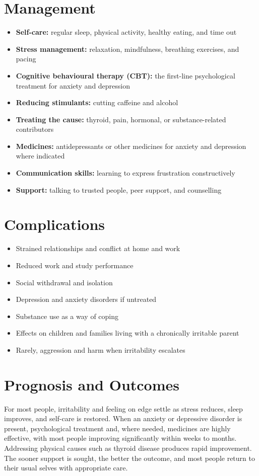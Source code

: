 \section*{Management}
\begin{itemize}
    \item \textbf{Self-care:} regular sleep, physical activity, healthy eating, and time out
    \item \textbf{Stress management:} relaxation, mindfulness, breathing exercises, and pacing
    \item \textbf{Cognitive behavioural therapy (CBT):} the first-line psychological treatment for anxiety and depression
    \item \textbf{Reducing stimulants:} cutting caffeine and alcohol
    \item \textbf{Treating the cause:} thyroid, pain, hormonal, or substance-related contributors
    \item \textbf{Medicines:} antidepressants or other medicines for anxiety and depression where indicated
    \item \textbf{Communication skills:} learning to express frustration constructively
    \item \textbf{Support:} talking to trusted people, peer support, and counselling
\end{itemize}

\section*{Complications}
\begin{itemize}
    \item Strained relationships and conflict at home and work
    \item Reduced work and study performance
    \item Social withdrawal and isolation
    \item Depression and anxiety disorders if untreated
    \item Substance use as a way of coping
    \item Effects on children and families living with a chronically irritable parent
    \item Rarely, aggression and harm when irritability escalates
\end{itemize}

\section*{Prognosis and Outcomes}
For most people, irritability and feeling on edge settle as stress reduces, sleep improves, and self-care is restored. When an anxiety or depressive disorder is present, psychological treatment and, where needed, medicines are highly effective, with most people improving significantly within weeks to months. Addressing physical causes such as thyroid disease produces rapid improvement. The sooner support is sought, the better the outcome, and most people return to their usual selves with appropriate care.

